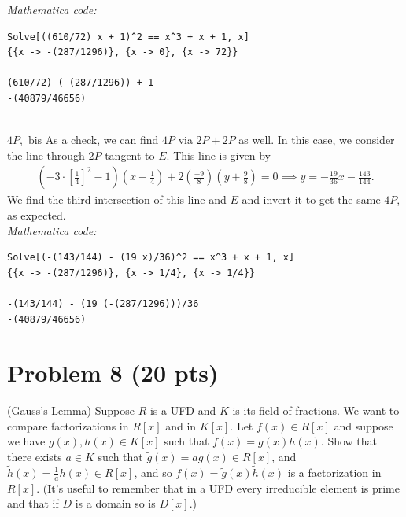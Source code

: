 \documentclass[12pt]{article}
\newcommand{\f}[2]{\frac{#1}{#2}}
\newcommand{\lp}{\left(}
\newcommand{\rp}{\right)}
\newcommand{\lb}{\left[}
\newcommand{\rb}{\right]}
\begin{document}
\noindent \textit{Mathematica code:}
\begin{lstlisting}
Solve[((610/72) x + 1)^2 == x^3 + x + 1, x]
{{x -> -(287/1296)}, {x -> 0}, {x -> 72}}

(610/72) (-(287/1296)) + 1
-(40879/46656)
\end{lstlisting}


$\,$\\

\noindent $\boxed{4P, \text{ bis}}$ As a check, we can find $4P$ via $2P + 2P$ as well. In this case, we consider the line through $2P$ tangent to $E$. This line is given by
\begin{align*}
\lp -3 \cdot \lb \f{1}{4} \rb^2 - 1 \rp \lp x - \f{1}{4} \rp + 2\lp\f{-9}{8}\rp\lp y + \f{9}{8} \rp = 0 \implies y = -\f{19}{36}x - \f{143}{144}.
\end{align*}
We find the third intersection of this line and $E$ and invert it to get the same $4P$, as expected. \\

\noindent \textit{Mathematica code:}
\begin{lstlisting}
Solve[(-(143/144) - (19 x)/36)^2 == x^3 + x + 1, x]
{{x -> -(287/1296)}, {x -> 1/4}, {x -> 1/4}}

-(143/144) - (19 (-(287/1296)))/36
-(40879/46656)
\end{lstlisting}  







































\newpage


\section*{Problem 8 \small{(20 pts)}}
(Gauss's Lemma) Suppose $R$ is a UFD and $K$ is its field of fractions. We want to compare factorizations in $R[x]$ and in $K[x]$. Let $f(x)\in R[x]$ and suppose we have $g(x), h(x) \in K[x]$ such that $f(x) = g(x)h(x)$. Show that there exists $a\in K$ such that $\tilde g(x)=  ag(x) \in R[x]$, and $\tilde h(x) = \f{1}{a}h(x) \in R[x]$, and so $f(x) = \tilde g(x) \tilde h(x)$ is a factorization in $R[x]$. (It's useful to remember that in a UFD every irreducible element is prime and that if $D$ is a domain so is $D[x]$.) \\
\end{document}
